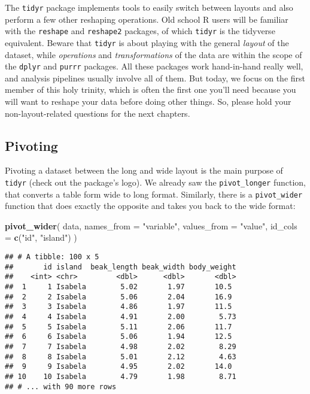 \documentclass[
]{book}
\newenvironment{Shaded}{}{}
\newcommand{\DataTypeTok}[1]{\textcolor[rgb]{0.56,0.13,0.00}{#1}}
\newcommand{\KeywordTok}[1]{\textcolor[rgb]{0.00,0.44,0.13}{\textbf{#1}}}
\newcommand{\NormalTok}[1]{#1}
\newcommand{\StringTok}[1]{\textcolor[rgb]{0.25,0.44,0.63}{#1}}
\begin{document}
The \texttt{tidyr} package implements tools to easily switch between layouts and also perform a few other reshaping operations. Old school R users will be familiar with the \texttt{reshape} and \texttt{reshape2} packages, of which \texttt{tidyr} is the tidyverse equivalent. Beware that \texttt{tidyr} is about playing with the general \emph{layout} of the dataset, while \emph{operations} and \emph{transformations} of the data are within the scope of the \texttt{dplyr} and \texttt{purrr} packages. All these packages work hand-in-hand really well, and analysis pipelines usually involve all of them. But today, we focus on the first member of this holy trinity, which is often the first one you'll need because you will want to reshape your data before doing other things. So, please hold your non-layout-related questions for the next chapters.

\hypertarget{pivoting}{%
\subsection{Pivoting}\label{pivoting}}

Pivoting a dataset between the long and wide layout is the main purpose of \texttt{tidyr} (check out the package's logo). We already saw the \texttt{pivot\_longer} function, that converts a table form wide to long format. Similarly, there is a \texttt{pivot\_wider} function that does exactly the opposite and takes you back to the wide format:

\begin{Shaded}
\begin{Highlighting}[]
\KeywordTok{pivot_wider}\NormalTok{(}
\NormalTok{  data, }
  \DataTypeTok{names_from =} \StringTok{"variable"}\NormalTok{, }
  \DataTypeTok{values_from =} \StringTok{"value"}\NormalTok{, }
  \DataTypeTok{id_cols =} \KeywordTok{c}\NormalTok{(}\StringTok{"id"}\NormalTok{, }\StringTok{"island"}\NormalTok{)}
\NormalTok{)}
\end{Highlighting}
\end{Shaded}

\begin{verbatim}
## # A tibble: 100 x 5
##       id island  beak_length beak_width body_weight
##    <int> <chr>         <dbl>      <dbl>       <dbl>
##  1     1 Isabela        5.02       1.97       10.5 
##  2     2 Isabela        5.06       2.04       16.9 
##  3     3 Isabela        4.86       1.97       11.5 
##  4     4 Isabela        4.91       2.00        5.73
##  5     5 Isabela        5.11       2.06       11.7 
##  6     6 Isabela        5.06       1.94       12.5 
##  7     7 Isabela        4.98       2.02        8.29
##  8     8 Isabela        5.01       2.12        4.63
##  9     9 Isabela        4.95       2.02       14.0 
## 10    10 Isabela        4.79       1.98        8.71
## # ... with 90 more rows
\end{verbatim}
\end{document}
